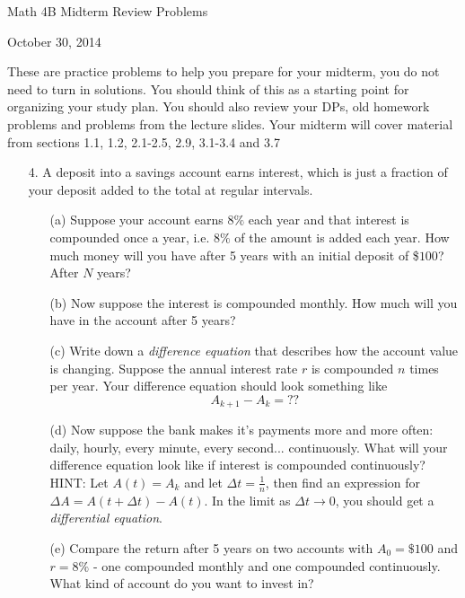 \documentclass[12pt]{article}
\newcommand{\noi}{\noindent}
\begin{document}
\begin{center}
Math 4B Midterm Review Problems

October 30, 2014
  
\end{center}

\noindent These are practice problems to help you prepare for your midterm, you do not need to turn in solutions.  You should think of this as a starting point for organizing your study plan.   You should also review your DPs, old homework problems and problems from the lecture slides.
\vskip 2mm
\noi Your midterm will cover material from sections 1.1, 1.2, 2.1-2.5, 2.9, 3.1-3.4 and 3.7  
\begin{itemize}




\item[4.] A deposit into a savings account earns interest, which is just a fraction of your deposit added to the total at regular intervals.  
\begin{itemize}
\item[(a)] Suppose your account earns $8\%$ each year and that interest is compounded once a year, i.e. $8\%$ of the amount is added each year.  How much money will you have after 5 years with an initial deposit of \$$100$?   After $N$ years?
\item[(b)] Now suppose the interest is compounded monthly.  How much will you have in the account after 5 years?
\item[(c)] Write down a \textit{difference equation} that describes how the account value is changing.  Suppose the annual interest rate $r$ is compounded $n$ times per year.  Your difference equation should look something like
$$A_{k+1} - A_k = ??$$
\item[(d)] Now suppose the bank makes it's payments more and more often:  daily, hourly, every minute, every second... continuously.  What will your difference equation look like if interest is compounded continuously?  HINT: Let $A(t) = A_k$ and let $\Delta t = \frac{1}{n}$, then find an expression for $\Delta A = A(t+\Delta t) - A(t)$.  In the limit as $\Delta t \to 0$, you should get a \textit{differential equation}.
\item[(e)] Compare the return after 5 years on two accounts with $A_0 = \$100$ and $r = 8\%$ - one compounded monthly and one compounded continuously.  What kind of account do you want to invest in?
\end{itemize}






\end{itemize}
\end{document}
